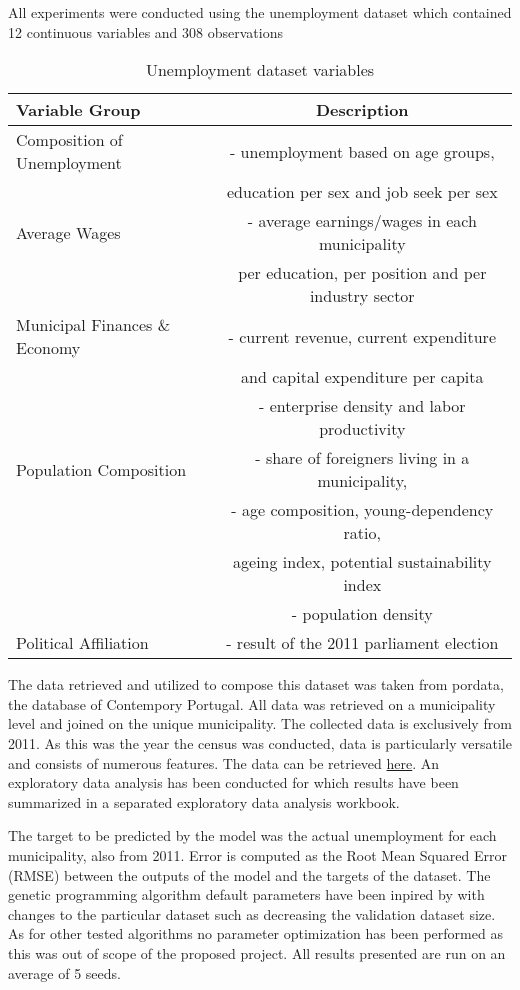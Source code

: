 \documentclass[12pt]{article}
\begin{document}
All experiments were conducted using the unemployment dataset which contained 12 continuous variables and 308 observations
\begin{table}[h!]
\centering
\begin{tabular}{||l | c||}

 \hline
 Variable Group & Description \\ [0.5ex]
 \hline\hline
 Composition of Unemployment &
  - unemployment based on age groups,\\
 & education per sex and job seek per sex  \\
 \hline
 Average Wages & - average earnings/wages in each municipality  \\
 & per education, per position and per industry sector\\
 \hline
 Municipal Finances \& Economy & - current revenue, current expenditure\\
 & and capital expenditure per capita  \\
 &  - enterprise density and labor productivity\\
 \hline
 Population Composition & - share of foreigners living in a municipality, \\
 & - age composition, young-dependency ratio, \\
 & ageing index, potential sustainability index \\
 & - population density\\
 \hline
 Political Affiliation & - result of the 2011 parliament election  \\ [1ex]
 \hline

\end{tabular}
\label{Table to test captions and labels}
\caption{Unemployment dataset variables}
\label{table}
\end{table}

The data retrieved and utilized to compose this dataset was taken from pordata, the database of Contempory Portugal. All data was retrieved on a municipality level and joined on the unique municipality. The collected data is exclusively from 2011. As this was the year the census was conducted, data is particularly versatile and consists of numerous features. The data can be retrieved \href{https://drive.google.com/open?id=1oQgpETAuAHQqdlWaiQMgGuqTx9VxdCZY}{here}. An exploratory data analysis has been conducted for which results have been summarized in a separated exploratory data analysis workbook.
\break

The target to be predicted by the model was the actual unemployment for each municipality, also from 2011. Error is computed as the Root Mean Squared Error (RMSE) between the outputs of the model and the targets of the dataset.
The genetic programming algorithm default parameters have been inpired by \cite{Goncalves} with changes to the particular dataset such as decreasing the validation dataset size. As for other tested algorithms no parameter optimization has been performed as this was out of scope of the proposed project. All results presented are run on an average of 5 seeds.
\end{document}
